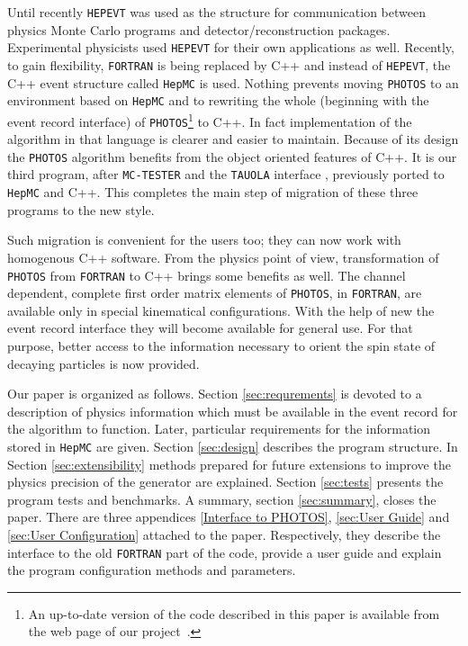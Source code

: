 \documentclass[]{Photos_interface_design}
\begin{document}
Until recently {\tt HEPEVT} \cite{Altarelli:1989wu} was used as the structure for 
communication between physics Monte Carlo programs and detector/reconstruction 
packages. Experimental physicists used {\tt HEPEVT} 
for their own applications  as well. Recently, to gain  flexibility, {\tt FORTRAN} is being replaced by C++ and 
instead of {\tt HEPEVT}, the C++ event structure called {\tt HepMC} \cite{Dobbs:2001ck}
is used. Nothing prevents 
moving {\tt PHOTOS} to an environment based on  {\tt HepMC}
and to rewriting the whole (beginning with the event record interface)
of {\tt PHOTOS}\footnote{An up-to-date version of the code described in this paper is
available from the web page of our project~\cite{photosC++}. 
  }
 to C++. In fact implementation of the algorithm in that language 
is clearer and easier to
 maintain. Because of its design the {\tt PHOTOS} algorithm benefits from the object 
oriented features of C++. It is our third program, after {\tt MC-TESTER} \cite{Davidson:2008ma}
and the {\tt TAUOLA} interface \cite{Davidson:2010rw}, previously ported to {\tt HepMC} and C++.
This completes the main step of migration of these three programs to the new style.

Such migration is convenient for the users too; they can now work
with  homogenous C++ software. From the physics point of view, transformation 
of {\tt PHOTOS} 
from {\tt FORTRAN} to C++  brings some benefits as well.
The channel dependent, complete first order matrix elements of {\tt PHOTOS}, in {\tt FORTRAN},
 are available only 
in special
kinematical configurations. With the help of new the event record interface they will become
available for general use.
For that purpose, better access to the information necessary to orient the spin state of decaying particles
is now provided.



Our paper is organized as follows. Section \ref{sec:requrements} is devoted
to a description of physics information which must be available in the event
record for the algorithm to function. Later, particular requirements for the 
information stored in {\tt HepMC} are given. Section \ref{sec:design} describes
the program structure. In Section \ref{sec:extensibility} methods prepared for 
future extensions to improve the physics precision of the generator are explained.
Section \ref{sec:tests} presents the program tests and benchmarks. 
A summary, section \ref{sec:summary}, closes the paper.
There are three appendices \ref{Interface to PHOTOS}, 
\ref{sec:User Guide} and \ref{sec:User Configuration} attached to the paper.
Respectively, they describe the interface to the old {\tt FORTRAN} part of the code,
provide a user guide and explain the program configuration methods and parameters. 
\end{document}
